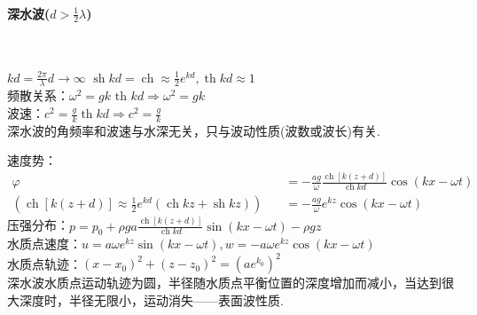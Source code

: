 \documentclass[a4paper,12pt]{article}
\begin{document}
    \paragraph{深水波($d>\frac{1}{2}\lambda$)}~{}\\
    \begin{spacing}{2}
        $\displaystyle kd=\frac{2\pi}{\lambda}d\rightarrow \infty$
    $\displaystyle \operatorname{sh}kd=\operatorname{ch}\approx \frac{1}{2} e^{kd},\operatorname{th}kd\approx 1$\\
    频散关系：$\displaystyle \omega^{2}=g k \text { th } k d \Rightarrow \omega^{2}=g k$\\
    波速：$\displaystyle c^{2}=\frac{g}{k} \operatorname{th} k d \Rightarrow c^{2}=\frac{g}{k}$\\
    深水波的角频率和波速与水深无关，只与波动性质(波数或波长)有关.\\
    \end{spacing}
    速度势：
    \[
    \begin{aligned}
        \varphi&=-\frac{a g}{\omega} \frac{\operatorname{ch}[k(z+d)]}{\operatorname{ch} k d} \cos (k x-\omega t)\\
        \left(\operatorname{ch}[k(z+d)]\approx\frac{1}{2}e^{kd}(\operatorname{ch}kz+\operatorname{sh}kz)\right)\quad&=-\frac{a g}{\omega} e^{kz} \cos (k x-\omega t)
    \end{aligned}
    \]
    压强分布：$\displaystyle p=p_{0}+\rho g a \frac{\operatorname{ch}[k(z+d)]}{\operatorname{ch} k d} \sin (k x-\omega t)-\rho g z$\\
    水质点速度：$\displaystyle u=a\omega e^{kz}\sin(kx-\omega t),w=-a\omega e^{kz}\cos (kx-\omega t)$\\
    水质点轨迹：$\displaystyle \left(x-x_{0}\right)^{2}+\left(z-z_{0}\right)^{2}=\left(a e^{k_{0}}\right)^{2}$\\
    深水波水质点运动轨迹为圆，半径随水质点平衡位置的深度增加而减小，当达到很大深度时，半径无限小，运动消失——表面波性质.
\end{document}
